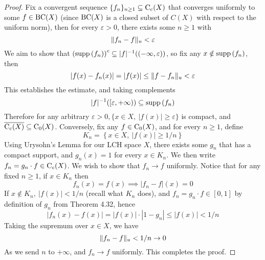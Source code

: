 \documentclass[../../main.tex]{subfiles}
\begin{document}
\begin{proof}
Fix a convergent sequence $\{f_n\}_{n\geq 1}\subseteq \operatorname{C}_c({X})$ that converges uniformly to some $f\in \operatorname{BC}({X})$ (since $\operatorname{BC}({X})$ is a closed subset of $C(X)$ with respect to the uniform norm), then for every $\varepsilon>0$, there exists some $n\geq 1$ with
\[
\lVert {f_n-f} \rVert_u<\varepsilon
\]
We aim to show that $\left(\operatorname{supp}{(f_n)}\right)^c\subseteq |f|^{-1}((-\infty,\varepsilon))$, so fix any $x\notin \operatorname{supp}{(f_n)}$, then
\[
|f(x)-f_n(x)|=|f(x)|\leq\lVert {f-f_n} \rVert_u<\varepsilon
\]
This establishes the estimate, and taking complements
\[
|f|^{-1}([\varepsilon, +\infty))\subseteq\operatorname{supp}{(f_n)}
\]
Therefore for any arbitrary $\varepsilon>0, \{x\in X,\:|f(x)|\geq\varepsilon\}$ is compact, and $\overline{\operatorname{C}_c({X})}\subseteq\operatorname{C}_0({X})$. Conversely, fix any $f\in\operatorname{C}_0({X})$, and for every $n\geq 1$, define
\[
K_n = \left\{x\in X,\:|f(x)|\geq 1/n\right\}
\]
Using Urysohn's Lemma for our LCH space $X$, there exists some $g_n$ that has a compact support, and $g_n(x)=1$ for every $x\in K_n$. We then write $f_n=g_n\cdot f\in\operatorname{C}_c({X})$. We wish to show that $f_n\to f$ uniformly. Notice that for any fixed $n\geq 1$, if $x\in K_n$ then
\[
f_n(x)=f(x)\implies |f_n-f|(x)=0
\]
If $x\notin K_n,\: |f(x)|<1/n$ (recall what $K_n$ does), and $f_n=g_n\cdot f\in[0,1]$ by definition of $g_n$ from Theorem 4.32, hence
\[
|f_n(x)-f(x)|=|f(x)|\cdot|1-g_n|\leq|f(x)|<1/n
\]
Taking the supremum over $x\in X$, we have
\[
\lVert {f_n-f} \rVert_u<1/n\to 0
\]
As we send $n$ to $+\infty$, and $f_n\to f$ uniformly. This completes the proof.
\end{proof}
\end{document}
